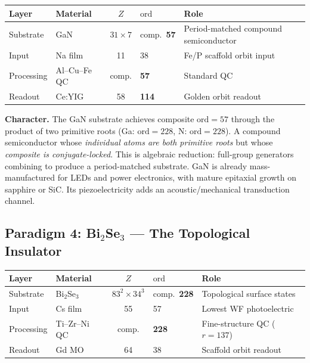 \begin{center}
\begin{tabular}{@{}llcll@{}}
\toprule
\textbf{Layer} & \textbf{Material} & $Z$ & $\mathrm{ord}$ & \textbf{Role} \\
\midrule
Substrate & GaN & $31 \times 7$ & comp.\ \textbf{57} & Period-matched compound semiconductor \\
Input & Na film & 11 & 38 & Fe/P scaffold orbit input \\
Processing & Al--Cu--Fe QC & comp. & \textbf{57} & Standard QC \\
Readout & Ce:YIG & 58 & \textbf{114} & Golden orbit readout \\
\bottomrule
\end{tabular}
\end{center}

\noindent \textbf{Character.} The GaN substrate achieves composite $\mathrm{ord} = 57$ through the product of two primitive roots (Ga: $\mathrm{ord} = 228$, N: $\mathrm{ord} = 228$). A compound semiconductor whose \emph{individual atoms are both primitive roots} but whose \emph{composite is conjugate-locked}. This is algebraic reduction: full-group generators combining to produce a period-matched substrate. GaN is already mass-manufactured for LEDs and power electronics, with mature epitaxial growth on sapphire or SiC. Its piezoelectricity adds an acoustic/mechanical transduction channel.

\subsection{Paradigm 4: Bi$_2$Se$_3$ --- The Topological Insulator}

\begin{center}
\begin{tabular}{@{}llcll@{}}
\toprule
\textbf{Layer} & \textbf{Material} & $Z$ & $\mathrm{ord}$ & \textbf{Role} \\
\midrule
Substrate & Bi$_2$Se$_3$ & $83^2 \times 34^3$ & comp.\ \textbf{228} & Topological surface states \\
Input & Cs film & 55 & 57 & Lowest WF photoelectric \\
Processing & Ti--Zr--Ni QC & comp. & \textbf{228} & Fine-structure QC ($r = 137$) \\
Readout & Gd MO & 64 & 38 & Scaffold orbit readout \\
\bottomrule
\end{tabular}
\end{center}


